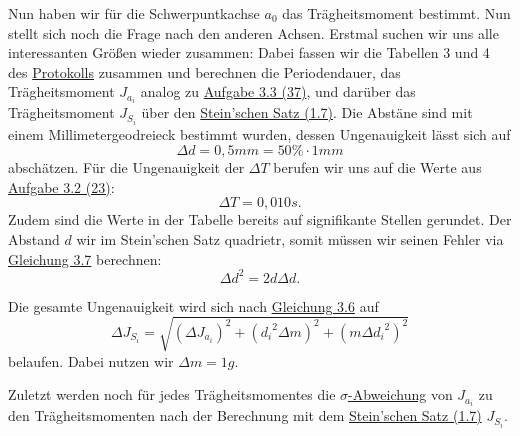 Nun haben wir für die Schwerpuntkachse $a_0$ das Trägheitsmoment bestimmt. Nun stellt sich noch die Frage nach den anderen Achsen. Erstmal suchen wir uns alle interessanten Größen wieder zusammen:
Dabei fassen wir die Tabellen 3 und 4 des \hyperref[Protokoll]{Protokolls} zusammen und berechnen die Periodendauer, das Trägheitsmoment $J_{a_i}$ analog zu \hyperref[aufgabe_3-3]{Aufgabe 3.3 (37)}, und darüber das Trägheitsmoment $J_{S_i}$ über den \hyperref[eq:steinsatz]{Stein'schen Satz (1.7)}.
Die Abstäne sind mit einem Millimetergeodreieck bestimmt wurden, dessen Ungenauigkeit lässt sich auf 
\begin{equation}
    \Delta d = 0,5mm = 50\% \cdot 1mm
\end{equation}
abschätzen. Für die Ungenauigkeit der $\Delta T$ berufen wir uns auf die Werte aus \hyperref[eq:t_reak]{Aufgabe 3.2 (23)}:
\begin{equation}
    \Delta T = 0,010 s.
\end{equation}
Zudem sind die Werte in der Tabelle bereits auf signifikante Stellen gerundet. 
Der Abstand $d$ wir im Stein'schen Satz quadrietr, somit müssen wir seinen Fehler via \hyperref[eq:gauss_fehlfortpflanzung]{Gleichung 3.7} berechnen:
\begin{equation}
    \Delta d^2 = 2d \Delta d.
\end{equation}

Die gesamte Ungenauigkeit wird sich nach \hyperref[eq:fehler_summe]{Gleichung 3.6} auf
\begin{equation}
    \Delta J_{S_i} = \sqrt{(\Delta J_{a_i})^2 + ({d_i}^2 \Delta m)^2 + (m \Delta {d_i}^2)^2}
\end{equation}
belaufen. Dabei nutzen wir $\Delta m = 1g$.

Zuletzt werden noch für jedes Trägheitsmomentes die \hyperref[eq:signifikante_abweichung]{$\sigma$-Abweichung} von $J_{a_i}$ zu den Trägheitsmomenten nach der Berechnung mit dem \hyperref[eq:steinsatz]{Stein'schen Satz (1.7)} $J_{S_i}$.

